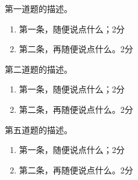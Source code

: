 \documentclass[]{cuzexam}
\begin{document}

\begin{problem}
    第一道题的描述。
\end{problem}

\begin{solution}
    \begin{enumerate}[label=(\arabic*)]
        \item 第一条，随便说点什么；\dotfill 2分
        \item 第二条，再随便说点什么。\dotfill 2分
    \end{enumerate}
\end{solution}

\begin{studentanswer}
    \vspace{28ex}
\end{studentanswer}

\begin{problem}
    第二道题的描述。
\end{problem}

\begin{solution}
    \begin{enumerate}[label=(\arabic*)]
        \item 第一条，随便说点什么；\dotfill 2分
        \item 第二条，再随便说点什么。\dotfill 2分
    \end{enumerate}
\end{solution}

\begin{studentanswer}
    \vspace{28ex}
\end{studentanswer}

\begin{problem}
    第五道题的描述。
\end{problem}

\begin{solution}
    \begin{enumerate}[label=(\arabic*)]
        \item 第一条，随便说点什么；\dotfill 2分
        \item 第二条，再随便说点什么。\dotfill 2分
    \end{enumerate}
\end{solution}

\begin{studentanswer}
    \vspace{28ex}
\end{studentanswer}
\end{document}
